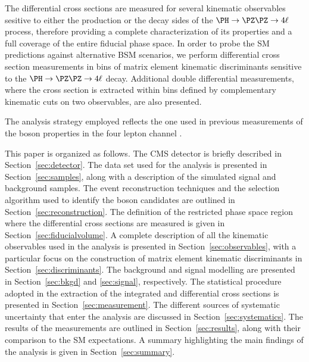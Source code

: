 The differential cross sections are measured for several kinematic observables sesitive to either the production or the decay sides of the $\HZZfl$ process, therefore providing a complete characterization of its properties and a full coverage of the entire fiducial phase space.
In order to probe the SM predictions against alternative BSM scenarios, we perform differential cross section measurements in bins of matrix element kinematic discriminants sensitive to the $\HZZfl$ decay.
Additional double differential measurements, where the cross section is extracted within bins defined by complementary kinematic cuts on two observables, are also presented. 

The analysis strategy employed reflects the one used in previous measurements of the \PH boson properties in the four lepton channel \cite{CMSH4lFiducial8TeV, CMSHIG19001}.

This paper is organized as follows. 
The CMS detector is briefly described in Section~\ref{sec:detector}.
The data set used for the analysis is presented in Section~\ref{sec:samples}, along with a description of the simulated signal and background samples.
The event reconstruction techniques and the selection algorithm used to identify the \PH boson candidates are outlined in Section~\ref{sec:reconstruction}.
The definition of the restricted phase space region where the differential cross sections are measured is given in Section~\ref{sec:fiducialvolume}.
A complete description of all the kinematic observables used in the analysis is presented in Section~\ref{sec:observables}, with a particular focus on the construction of matrix element kinematic discriminants in Section~\ref{sec:discriminants}.
The background and signal modelling are presented in Section~\ref{sec:bkgd} and \ref{sec:signal}, respectively.
The statistical procedure adopted in the extraction of the integrated and differential cross sections is presented in Section~\ref{sec:measurement}. 
The different sources of systematic uncertainty that enter the analysis are discussed in Section~\ref{sec:systematics}.
The results of the measurements are outlined in Section~\ref{sec:results}, along with their comparison to the SM expectations.
A summary highlighting the main findings of the analysis is given in Section~\ref{sec:summary}.


